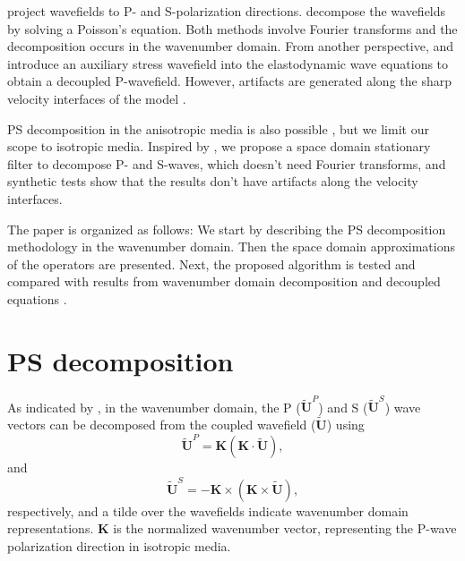 \documentclass[manuscript,ulem,graphix,revised]{geophysics}
\begin{document}
\citet{zhang10} project wavefields to P- and S-polarization directions. \citet{zhu17} decompose the wavefields by solving a Poisson's equation. Both methods involve Fourier transforms and the decomposition occurs in the wavenumber domain. From another perspective, \citet{ma03} and \citet{wenlong_vct15} introduce an auxiliary stress wavefield into the elastodynamic wave equations \citep{virieux84} to obtain a decoupled P-wavefield. However, artifacts are generated along the sharp velocity interfaces of the model \citep{wenlong_cmp15}. 

PS decomposition in the anisotropic media is also possible \citep{zhang10, cheng14, wenlong18}, but we limit our scope to isotropic media. Inspired by \citet{yan09}, we propose a space domain stationary filter to decompose P- and S-waves, which doesn't need Fourier transforms, and synthetic tests show that the results don't have artifacts along the velocity interfaces.

The paper is organized as follows: We start by describing the PS decomposition methodology in the wavenumber domain. Then the space domain approximations of the operators are presented. Next, the proposed algorithm is tested and compared with results from wavenumber domain decomposition \citep{zhang10} and decoupled equations \citep{ma03, wenlong_cmp15}. 



\section{PS decomposition}

As indicated by \citet{zhang10}, in the wavenumber domain, the P ($\tilde{\boldsymbol{U}}^P$) and S ($\tilde{\boldsymbol{U}}^S$) wave vectors can be decomposed from the coupled wavefield ($\tilde{\boldsymbol{U}}$) using
\begin{equation}
\tilde{\boldsymbol{U}}^P = \boldsymbol{K} (\boldsymbol{K} \cdot \tilde{\boldsymbol{U}}),
\label{eqn:p_wave}
\end{equation}
and
\begin{equation}
\tilde{\boldsymbol{U}}^S =-\boldsymbol{K} \times (\boldsymbol{K} \times \tilde{\boldsymbol{U}}),
\label{eqn:p_wave}
\end{equation}
respectively, and a tilde over the wavefields indicate wavenumber domain representations. $\boldsymbol{K}$ is the normalized wavenumber vector, representing the P-wave polarization direction in isotropic media.
\end{document}
